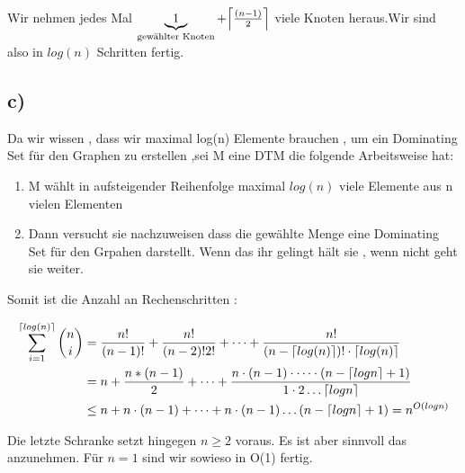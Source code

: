 \documentclass{article}
\def\mathify#1{\ifmmode{#1}\else\mbox{$#1$}\fi} %
\newcommand{\ceil}[1]{\mathify{\left\lceil {#1}\right\rceil}}
\begin{document}
			Wir nehmen jedes Mal $\underbrace{1}_{\text{gewählter Knoten}} +\ceil{\frac{(n-1)}{2}}$ viele Knoten heraus.Wir sind also in $log(n)$ Schritten fertig. 


		\subsection*{c)}
			Da wir wissen , dass wir maximal log(n) Elemente brauchen , um ein Dominating Set für den Graphen zu erstellen ,sei M eine DTM die folgende Arbeitsweise hat:

			\begin{enumerate}
				\item M wählt in aufsteigender Reihenfolge maximal $log(n)$ viele Elemente aus n vielen Elementen
				\item Dann versucht sie nachzuweisen dass die gewählte Menge eine Dominating Set für den Grpahen darstellt. Wenn das ihr gelingt hält sie , wenn nicht geht sie weiter.
			\end{enumerate}

			Somit ist die Anzahl an Rechenschritten :

			\begin{align*}
				\sum_{i=1}^{\ceil{log(n)}} \binom{n}{i} &= \frac{n!}{(n-1)!} + \frac{n!}{(n-2)!2!}+\cdots+\frac{n!}{(n-\ceil{log (n)})!\cdot \ceil{log(n)}} \\
				&= n + \frac{n * (n-1)}{2} + \dots + \frac{n \cdot (n-1) \cdot \dots \cdot (n- \ceil{log n}+1)}{1 \cdot 2 \dots \ceil{log n}} \\
				&\leq n + n\cdot (n-1) + \dots + n \cdot (n-1) \dots (n- \ceil{log n} +1) = n^{O(log n)} 
			\end{align*}

			Die letzte Schranke setzt hingegen $n \geq 2$ voraus. Es ist aber sinnvoll das anzunehmen.
			Für $n=1$ sind wir sowieso in O(1) fertig. 
			
\end{document}
